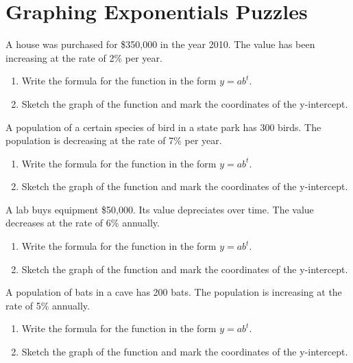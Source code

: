 \section{Graphing Exponentials Puzzles}

\begin{puzzle}
    A house was purchased for \$350,000 in the year 2010. The value has been increasing at the rate of 2\% per year.
    \begin{enumerate}
        \item Write the formula for the function in the form \( y = ab^t \).
        \item Sketch the graph of the function and mark the coordinates of the y-intercept.
    \end{enumerate}
\end{puzzle}


\begin{puzzle}
    A population of a certain species of bird in a state park has 300 birds. The population is decreasing at the rate of 7\% per year.
    \begin{enumerate}
        \item Write the formula for the function in the form \( y = ab^t \).
        \item Sketch the graph of the function and mark the coordinates of the y-intercept.
    \end{enumerate}

\end{puzzle}


\begin{puzzle}
    A lab buys equipment \$50,000. Its value depreciates over time. The value decreases at the rate of 6\% annually.
    \begin{enumerate}
        \item Write the formula for the function in the form \( y = ab^t \).
        \item Sketch the graph of the function and mark the coordinates of the y-intercept.
    \end{enumerate}
\end{puzzle}


\begin{puzzle}
    A population of bats in a cave has 200 bats. The population is increasing at the rate of 5\% annually.
    \begin{enumerate}
        \item Write the formula for the function in the form \( y = ab^t \).
        \item Sketch the graph of the function and mark the coordinates of the y-intercept.
    \end{enumerate}
\end{puzzle}

